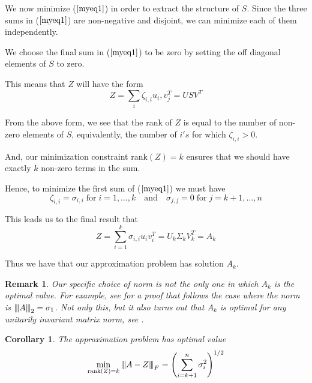 \documentclass[a4paper]{article}
\newcommand{\norm}[1]{{\left\vert\kern-0.25ex\left\vert\kern-0.25ex\left\vert #1 
    \right\vert\kern-0.25ex\right\vert\kern-0.25ex\right\vert}}
\newcommand{\rank}[1]{\text{rank}(#1)}
\newtheorem{remark}[theorem]{Remark}
\newtheorem{corollary}[theorem]{Corollary}
\begin{document}

We now minimize ($\ref{myeq1}$) in order to extract the structure of $S$. Since the three sums in ($\ref{myeq1}$) are non-negative and disjoint, we can minimize each of them independently.

We choose the final sum in ($\ref{myeq1}$) to be zero by setting the off diagonal elements of $S$ to zero.

This means that $Z$ will have the form
\begin{equation}
Z = \sum_i \zeta_{i,i} u_i, v_j^T = U S V^T
\end{equation}

From the above form, we see that the rank of $Z$ is equal to the number of non-zero elements of $S$, equivalently, the number of $i's$ for which $\zeta_{i,i}>0$.

And, our minimization constraint $\text{rank}(Z) = k$ ensures that we should have exactly $k$ non-zero terms in the sum.

Hence, to minimize the first sum of ($\ref{myeq1}$) we must have
$$\zeta_{i,i} = \sigma_{i,i} \; \text{for} \; i = 1,\dots,k \quad \text{and} \quad \sigma_{j,j}=0 \; \text{for} \; j=k+1,\dots, n$$

This leads us to the final result that
$$Z = \sum_{i=1}^k \sigma_{i,i} u_i v_i^T = U_k\Sigma_k V_k^T = A_k$$

Thus we have that our approximation problem has solution $A_k$.

\begin{remark}
Our specific choice of norm is not the only one in which $A_k$ is the optimal value.  For example, see \cite{golub} for a proof that follows the case where the norm is $\norm{A}_2=\sigma_1$.  Not only this, but it also turns out that $A_k$ is optimal for any unitarily invariant matrix norm, see \cite{golub2}.
\end{remark}

\pagebreak



\begin{corollary}
The approximation problem has optimal value
$$\min_{\rank{Z}=k}\norm{A-Z}_F = \left( \sum_{i=k+1}^n \sigma_i^2 \right)^{1/2}$$

\end{corollary}
\end{document}
